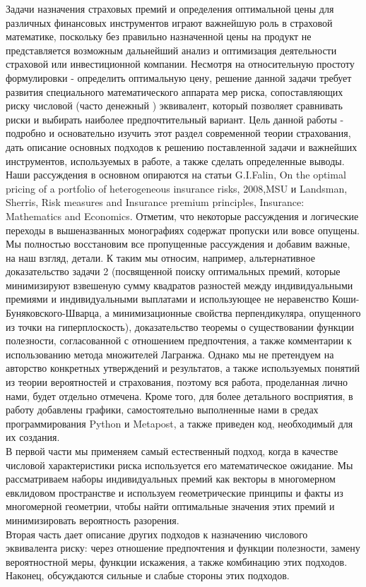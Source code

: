 \documentclass[12pt,a4paper]{article}
\begin{document}
Задачи назначения страховых премий и определения оптимальной цены для различных финансовых инструментов играют важнейшую роль в страховой 
математике, поскольку без правильно назначенной цены на продукт не представляется возможным дальнейший анализ  и оптимизация деятельности страховой или инвестиционной компании. Несмотря на относительную простоту формулировки  - определить оптимальную цену, решение данной задачи требует развития специального математического аппарата  мер риска, сопоставляющих риску числовой (часто денежный ) эквивалент, который позволяет сравнивать риски и выбирать наиболее предпочтительный вариант. Цель данной работы - подробно  и основательно изучить этот раздел современной теории страхования,   дать описание  основных подходов к решению поставленной задачи и важнейших инструментов, используемых в работе, а также сделать определенные выводы. Наши рассуждения в основном опираются на статьи G.I.Falin, On the optimal pricing of a portfolio of heterogeneous insurance risks, 2008,MSU и Landsman, Sherris, Risk measures and Insurance premium principles, Insurance: Mathematics and Economics. Отметим, что  некоторые рассуждения  и логические переходы в вышеназванных монографиях содержат пропуски или вовсе опущены. Мы полностью восстановим все пропущенные рассуждения и добавим важные, на наш взгляд, детали. К таким мы относим, например, альтернативное доказательство задачи 2 (посвященной поиску оптимальных премий, которые  минимизируют взвешеную сумму квадратов разностей между индивидуальными премиями и индивидуальными выплатами и  использующее  не неравенство Коши-Буняковского-Шварца, а минимизационные  свойства перпендикуляра, опущенного из точки на гиперплоскость), доказательство теоремы о существовании функции полезности, согласованной с отношением предпочтения, а также комментарии к использованию метода множителей Лагранжа. Однако мы не претендуем на авторство конкретных утверждений и результатов, а также используемых понятий из теории вероятностей и страхования, поэтому вся работа, проделанная лично нами, будет отдельно отмечена.  Кроме того, для более детального восприятия, в работу добавлены графики, самостоятельно выполненные  нами в средах программирования Python и Metapost, а также приведен код, необходимый для их создания. \\
В первой части  мы применяем самый естественный подход, когда в качестве числовой характеристики риска используется его математическое ожидание.
Мы  рассматриваем наборы  индивидуальных премий как векторы в многомерном евклидовом пространстве и  используем  геометрические принципы и факты из многомерной геометрии, чтобы найти оптимальные значения этих премий и минимизировать вероятность  разорения. \\
Вторая часть дает описание других  подходов к назначению числового эквивалента риску: через отношение предпочтения и  функции полезности,  замену вероятностной меры,  функции искажения, а также комбинацию этих подходов.  Наконец, обсуждаются сильные и слабые стороны этих подходов.
\end{document}
